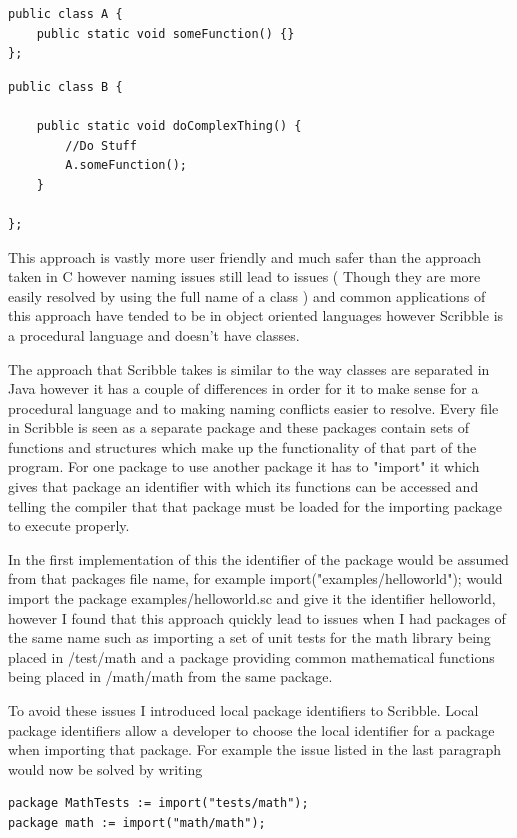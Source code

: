 \documentclass[]{final_report}
\begin{document}
\begin{verbatim}
public class A {
    public static void someFunction() {}
};
\end{verbatim}

\begin{verbatim}
public class B {

    public static void doComplexThing() {
        //Do Stuff
        A.someFunction();
    }

};
\end{verbatim}

This approach is vastly more user friendly and much safer than the approach taken in C however naming issues still lead to issues ( Though they are more easily resolved by using the full name of a class ) and common applications of this approach have tended to be in object oriented languages however Scribble is a procedural language and doesn't have classes.

The approach that Scribble takes is similar to the way classes are separated in Java however it has a couple of differences in order for it to make sense for a procedural language and to making naming conflicts easier to resolve. Every file in Scribble is seen as a separate package and these packages contain sets of functions and structures which make up the functionality of that part of the program. For one package to use another package it has to "import" it which gives that package an identifier with which its functions can be accessed and telling the compiler that that package must be loaded for the importing package to execute properly.

In the first implementation of this the identifier of the package would be assumed from that packages file name, for example import("examples/helloworld"); would import the package examples/helloworld.sc and give it the identifier helloworld, however I found that this approach quickly lead to issues when I had packages of the same name such as importing a set of unit tests for the math library being placed in /test/math and a package providing common mathematical functions being placed in /math/math from the same package. 

To avoid these issues I introduced local package identifiers to Scribble. Local package identifiers allow a developer to choose the local identifier for a package when importing that package. For example the issue listed in the last paragraph would now be solved by writing
\begin{verbatim}
package MathTests := import("tests/math");
package math := import("math/math");
\end{verbatim}
\end{document}
